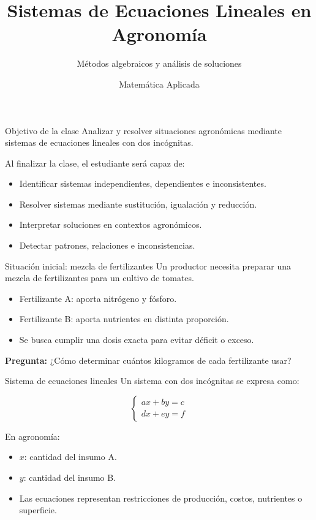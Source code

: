 \documentclass{beamer}
\title{Sistemas de Ecuaciones Lineales en Agronomía}
\subtitle{Métodos algebraicos y análisis de soluciones}
\author{Matemática Aplicada}
\date{}
\begin{document}
	
	\frame{\titlepage}
	
	\begin{frame}{Objetivo de la clase}
		Analizar y resolver situaciones agronómicas mediante sistemas de ecuaciones lineales con dos incógnitas.
		
		\bigskip
		
		Al finalizar la clase, el estudiante será capaz de:
		
		\begin{itemize}
			\item Identificar sistemas independientes, dependientes e inconsistentes.
			\item Resolver sistemas mediante sustitución, igualación y reducción.
			\item Interpretar soluciones en contextos agronómicos.
			\item Detectar patrones, relaciones e inconsistencias.
		\end{itemize}
	\end{frame}
	
	\begin{frame}{Situación inicial: mezcla de fertilizantes}
		Un productor necesita preparar una mezcla de fertilizantes para un cultivo de tomates.
		
		\bigskip
		
		\begin{itemize}
			\item Fertilizante A: aporta nitrógeno y fósforo.
			\item Fertilizante B: aporta nutrientes en distinta proporción.
			\item Se busca cumplir una dosis exacta para evitar déficit o exceso.
		\end{itemize}
		
		\bigskip
		
		\textbf{Pregunta:}  
		¿Cómo determinar cuántos kilogramos de cada fertilizante usar?
	\end{frame}
	
	\begin{frame}{Sistema de ecuaciones lineales}
		Un sistema con dos incógnitas se expresa como:
		
		\[
		\begin{cases}
			ax + by = c \\
			dx + ey = f
		\end{cases}
		\]
		
		\bigskip
		
		En agronomía:
		
		\begin{itemize}
			\item $x$: cantidad del insumo A.
			\item $y$: cantidad del insumo B.
			\item Las ecuaciones representan restricciones de producción, costos, nutrientes o superficie.
		\end{itemize}
	\end{frame}
	
\end{document}
